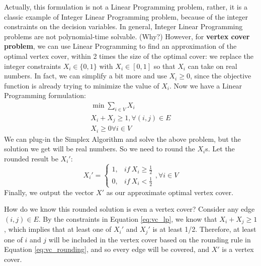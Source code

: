 \documentclass{article}
\begin{document}
Actually, this formulation is not a Linear Programming problem, rather, it is
a classic example of Integer Linear Programming problem, because of the integer
constraints on the decision variables.
In general, Integer Linear Programming problems are not polynomial-time
solvable. (Why?) However, for {\bf vertex cover problem}, we can use Linear
Programming to find an approximation of the optimal vertex cover, within 2 times
the size of the optimal cover: 
we replace the integer constraints $X_i \in \{0,1\}$
with $X_i \in [0, 1]$ so that $X_i$ can take on real numbers.
In fact, we can simplify a bit more and use $X_i \ge 0$, since the objective
function is already trying to minimize the value of $X_i$.
Now we have a Linear Programming formulation:
\begin{equation}
\label{eq:vc_lp}
\begin{split}
	\min \sum_{i \in V} X_i\\
	X_i + X_j \ge 1, \forall (i, j) \in E\\
	X_i \ge 0 \forall i \in V
\end{split}
\end{equation}
We can plug-in the Simplex Algorithm and solve the above problem, but the
solution we get will be real numbers. So we need to round the $X_i$s.
Let the rounded result be $X_i'$:
\begin{equation}
\label{eq:vc_rounding}
	X_i' = \left\{\begin{matrix}
		1, & if~X_i \ge \frac{1}{2}\\ 
		0, & if~X_i < \frac{1}{2}
	\end{matrix}\right., 
	\forall i \in V
\end{equation}
Finally, we output the vector $X'$ as our approximate optimal vertex cover.

How do we know this rounded solution is even a vertex cover? Consider any edge 
$(i,j) \in E$. By the constraints in Equation \ref{eq:vc_lp}, we know that
$X_i + X_j \ge 1$, which implies that at least one of $X_i'$ and $X_j'$ is
at least 1/2. Therefore, at least one of $i$ and $j$ will be included in the
vertex cover based on the rounding rule in Equation \ref{eq:vc_rounding}, 
and so every edge will be covered, and $X'$ is a vertex cover.
\end{document}
